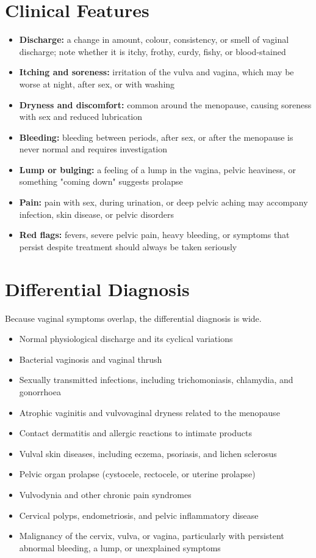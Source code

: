 \section*{Clinical Features}
\begin{itemize}
    \item \textbf{Discharge:} a change in amount, colour, consistency, or smell of vaginal discharge; note whether it is itchy, frothy, curdy, fishy, or blood-stained
    \item \textbf{Itching and soreness:} irritation of the vulva and vagina, which may be worse at night, after sex, or with washing
    \item \textbf{Dryness and discomfort:} common around the menopause, causing soreness with sex and reduced lubrication
    \item \textbf{Bleeding:} bleeding between periods, after sex, or after the menopause is never normal and requires investigation
    \item \textbf{Lump or bulging:} a feeling of a lump in the vagina, pelvic heaviness, or something "coming down" suggests prolapse
    \item \textbf{Pain:} pain with sex, during urination, or deep pelvic aching may accompany infection, skin disease, or pelvic disorders
    \item \textbf{Red flags:} fevers, severe pelvic pain, heavy bleeding, or symptoms that persist despite treatment should always be taken seriously
\end{itemize}

\section*{Differential Diagnosis}
Because vaginal symptoms overlap, the differential diagnosis is wide.

\begin{itemize}
    \item Normal physiological discharge and its cyclical variations
    \item Bacterial vaginosis and vaginal thrush
    \item Sexually transmitted infections, including trichomoniasis, chlamydia, and gonorrhoea
    \item Atrophic vaginitis and vulvovaginal dryness related to the menopause
    \item Contact dermatitis and allergic reactions to intimate products
    \item Vulval skin diseases, including eczema, psoriasis, and lichen sclerosus
    \item Pelvic organ prolapse (cystocele, rectocele, or uterine prolapse)
    \item Vulvodynia and other chronic pain syndromes
    \item Cervical polyps, endometriosis, and pelvic inflammatory disease
    \item Malignancy of the cervix, vulva, or vagina, particularly with persistent abnormal bleeding, a lump, or unexplained symptoms
\end{itemize}

